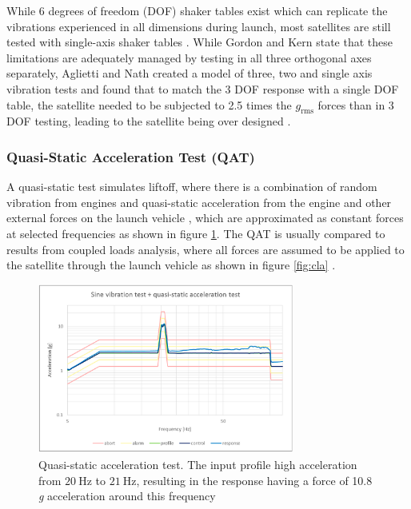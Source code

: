 \documentclass{report}
\begin{document}
While 6 degrees of freedom (DOF) shaker tables exist which can replicate the vibrations experienced in all dimensions during launch, most satellites are still tested with single-axis shaker tables \cite{gordon2015benefits,aglietti2019spacecraft,nath2022study}. While Gordon and Kern \cite{gordon2015benefits} state that these limitations are adequately managed by testing in all three orthogonal axes separately, Aglietti and Nath \cite{nath2022study} created a model of three, two and single axis vibration tests and found that to match the 3 DOF response with a single DOF table, the satellite needed to be subjected to 2.5 times the $g_\text{rms}$ forces than in 3 DOF testing, leading to the satellite being over designed \cite{nath2022study}.

\subsubsection{Quasi-Static Acceleration Test (QAT)}
A quasi-static test simulates liftoff, where there is a combination of random vibration from engines and quasi-static acceleration from the engine and other external forces on the launch vehicle \cite{nieto2019cubesat,brown_elements_2002}, which are approximated as constant forces at selected frequencies as shown in figure \ref{fig:qatforces}. The QAT is usually compared to results from coupled loads analysis, where all forces are assumed to be applied to the satellite through the launch vehicle as shown in figure \ref{fig:cla} \cite{dickens2001coupled}.

\begin{figure}[H]
  \centering
  \includegraphics[width=0.75\textwidth]{images/qat.png}
  \caption{Quasi-static acceleration test. The input profile high acceleration from $\SI{20}{\hertz}$ to $\SI{21}{\hertz}$, resulting in the response having a force of 10.8 \textit{g} acceleration around this frequency \cite{nieto2019cubesat}}
  \label{fig:qatforces}
\end{figure}
\end{document}
